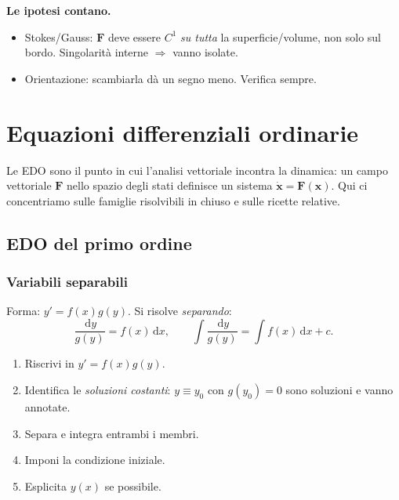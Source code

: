 \documentclass[11pt,a4paper,openany]{book}
\theoremstyle{plain}
\theoremstyle{definition}
\theoremstyle{remark}
\newcommand{\dd}{\,\mathrm{d}}
\renewcommand{\vec}[1]{\mathbf{#1}}
\newcommand{\F}{\mathbf{F}}
\begin{document}
\begin{trappola}
\textbf{Le ipotesi contano.}
\begin{itemize}[leftmargin=*]
  \item Stokes/Gauss: $\F$ deve essere $C^1$ \emph{su tutta} la superficie/volume,
        non solo sul bordo. Singolarit\`a interne $\Rightarrow$ vanno isolate.
  \item Orientazione: scambiarla d\`a un segno meno. Verifica sempre.
\end{itemize}
\end{trappola}

\chapter{Equazioni differenziali ordinarie}

Le EDO sono il punto in cui l'analisi vettoriale incontra la dinamica: un
campo vettoriale $\F$ nello spazio degli stati definisce un sistema
$\dot{\vec{x}}=\F(\vec{x})$. Qui ci concentriamo sulle famiglie risolvibili
in chiuso e sulle ricette relative.

\section{EDO del primo ordine}

\subsection{Variabili separabili}

Forma: $y'=f(x)g(y)$. Si risolve \emph{separando}:
\begin{equation}
  \frac{\dd y}{g(y)}=f(x)\dd x,\qquad
  \int\frac{\dd y}{g(y)}=\int f(x)\dd x+c.
  \label{eq:sep}
\end{equation}

\begin{ricetta}
\begin{enumerate}[leftmargin=*]
  \item Riscrivi in $y'=f(x)g(y)$.
  \item Identifica le \emph{soluzioni costanti}: $y\equiv y_0$ con $g(y_0)=0$
        sono soluzioni e vanno annotate.
  \item Separa e integra entrambi i membri.
  \item Imponi la condizione iniziale.
  \item Esplicita $y(x)$ se possibile.
\end{enumerate}
\end{ricetta}
\end{document}
